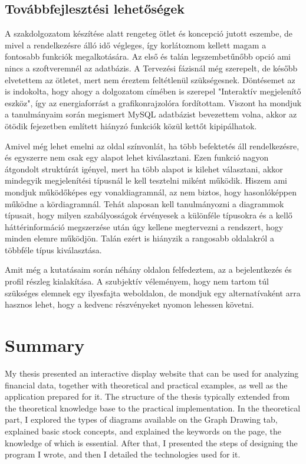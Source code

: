 \subsection{Továbbfejlesztési lehetőségek}

A szakdolgozatom készítése alatt rengeteg ötlet és koncepció jutott eszembe, de mivel a rendelkezésre álló idő végleges, így korlátoznom kellett magam a fontosabb funkciók megalkotására. Az első és talán legszembetűnőbb opció ami nincs a szoftveremnél az adatbázis. A Tervezési fázisnál még szerepelt, de később elvetettem az ötletet, mert nem éreztem feltétlenül szükségesnek. Döntésemet az is indokolta, hogy ahogy a dolgozatom címében is szerepel "Interaktív megjelenítő eszköz", így az energiaforrást a grafikonrajzolóra fordítottam. Viszont ha mondjuk a tanulmányaim során megismert MySQL adatbázist bevezettem volna, akkor az ötödik fejezetben említett hiányzó funkciók közül kettőt kipipálhatok.

	Amivel még lehet emelni az oldal színvonlát, ha több befektetés áll rendelkezésre, és egyszerre nem csak egy alapot lehet kiválasztani. Ezen funkció nagyon átgondolt struktúrát igényel, mert ha több alapot is kilehet választani, akkor mindegyik megjelenítési típusnál le kell tesztelni miként működik. Hiszem ami mondjuk működőképes egy vonaldiagramnál, az nem biztos, hogy hasonlóképpen működne a kördiagramnál. Tehát alaposan kell tanulmányozni a diagrammok típusait, hogy milyen szabályosságok érvényesek a különféle típusokra és a kellő háttérinformáció megszerzése után úgy kellene megtervezni a rendszert, hogy minden elemre működjön. Talán ezért is hiányzik a rangosabb oldalakról a többféle típus kiválasztása.

	Amit még a kutatásaim során néhány oldalon felfedeztem, az a bejelentkezés és profil részleg kialakítása. A szubjektív véleményem, hogy nem tartom túl szükséges elemnek egy ilyesfajta weboldalon, de mondjuk egy alternatívaként arra hasznos lehet, hogy a kedvenc részvényeket nyomon lehessen követni.

\section{Summary}

My thesis presented an interactive display website that can be used for analyzing financial data, together with theoretical and practical examples, as well as the application prepared for it. The structure of the thesis typically extended from the theoretical knowledge base to the practical implementation. In the theoretical part, I explored the types of diagrams available on the Graph Drawing tab, explained basic stock concepts, and explained the keywords on the page, the knowledge of which is essential. After that, I presented the steps of designing the program I wrote, and then I detailed the technologies used for it.

